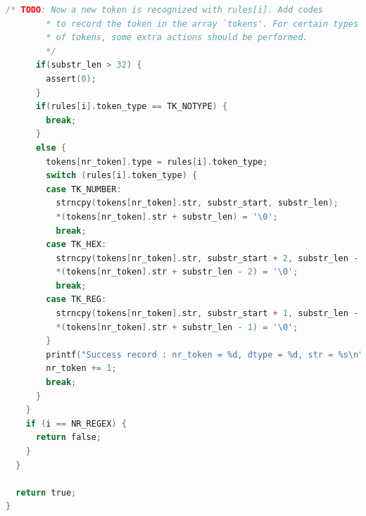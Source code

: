 \documentclass[UTF8,a4paper,10pt]{ctexart}
\begin{document}
\begin{itemize}
\begin{lstlisting}[language = C]
      /* TODO: Now a new token is recognized with rules[i]. Add codes
        * to record the token in the array `tokens'. For certain types
        * of tokens, some extra actions should be performed.
        */
      if(substr_len > 32) {
        assert(0);
      }
      if(rules[i].token_type == TK_NOTYPE) {
        break;
      }
      else {
        tokens[nr_token].type = rules[i].token_type;
        switch (rules[i].token_type) {
        case TK_NUMBER:
          strncpy(tokens[nr_token].str, substr_start, substr_len);
          *(tokens[nr_token].str + substr_len) = '\0';
          break;
        case TK_HEX:
          strncpy(tokens[nr_token].str, substr_start + 2, substr_len - 2); //跳过开头的0x
          *(tokens[nr_token].str + substr_len - 2) = '\0';
          break;
        case TK_REG: 
          strncpy(tokens[nr_token].str, substr_start + 1, substr_len - 1); //跳过开头的$
          *(tokens[nr_token].str + substr_len - 1) = '\0';
        }
        printf("Success record : nr_token = %d, dtype = %d, str = %s\n", nr_token, tokens[nr_token].type, tokens[nr_token].str);
        nr_token += 1;
        break;
      }
    }
    if (i == NR_REGEX) {
      return false;
    }
  }

  return true;
}
  \end{lstlisting}
\end{itemize}
\end{document}
